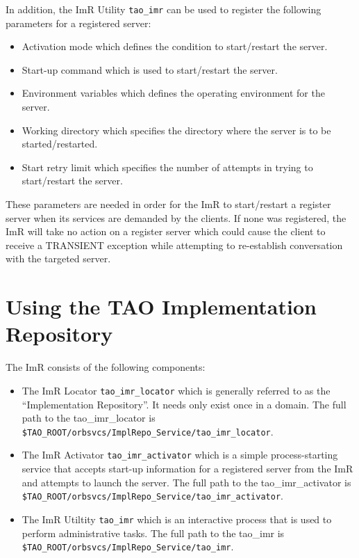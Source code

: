 In addition, the ImR Utility {\tt tao_imr} can be used to register the
following parameters for a registered server:
\begin{itemize}
     \item Activation mode which defines the condition to start/restart the server.
     \item Start-up command which is used to start/restart the server.
     \item Environment variables which defines the operating environment
              for the server.
     \item Working directory which specifies the directory where the server
               is to be started/restarted.
     \item Start retry limit which specifies the number of attempts in trying
               to start/restart the server.
\end{itemize}

These parameters are needed in order for the ImR to start/restart
a register server when its services are demanded by the clients.  If none
was registered, the ImR will take no action on a register server
which could cause the client  to receive a TRANSIENT exception
while attempting to re-establish conversation with the  targeted server.

\section{Using the TAO Implementation Repository}

The ImR consists of  the following components:
\begin{itemize}
    \item The ImR Locator {\tt tao\_imr\_locator} which is generally
              referred to as the “Implementation Repository”.  It needs only exist
              once in  a domain.  The full path to the tao\_imr\_locator is
              {\tt \$TAO\_ROOT/orbsvcs/ImplRepo\_Service/tao\_imr\_locator}.
    \item The ImR Activator {\tt tao\_imr\_activator} which is a
              simple process-starting service that accepts start-up information
              for a registered server from the ImR and attempts to launch
              the server.  The full path to the tao\_imr\_activator is
              {\tt \$TAO\_ROOT/orbsvcs/ImplRepo\_Service/tao_imr_activator}.
    \item The ImR Utiltity {\tt tao\_imr} which is an interactive
              process that is used to perform administrative tasks.  The full path to
              the tao\_imr is {\tt \$TAO\_ROOT/orbsvcs/ImplRepo\_Service/tao_imr}.
\end{itemize}

